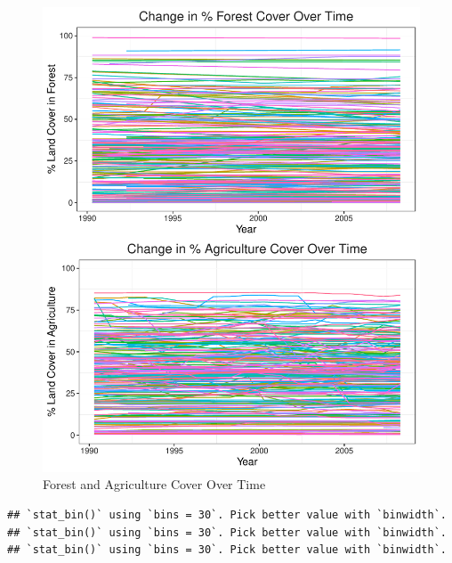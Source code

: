 \documentclass[12pt,]{article}
\begin{document}
\begin{figure}
\centering
\includegraphics{Marx_ENV872_Project_files/figure-latex/unnamed-chunk-3-1.pdf}
\caption{\label{fig:fig2}Forest and Agriculture Cover Over Time}
\end{figure}

\begin{verbatim}
## `stat_bin()` using `bins = 30`. Pick better value with `binwidth`.
## `stat_bin()` using `bins = 30`. Pick better value with `binwidth`.
## `stat_bin()` using `bins = 30`. Pick better value with `binwidth`.
\end{verbatim}
\end{document}
